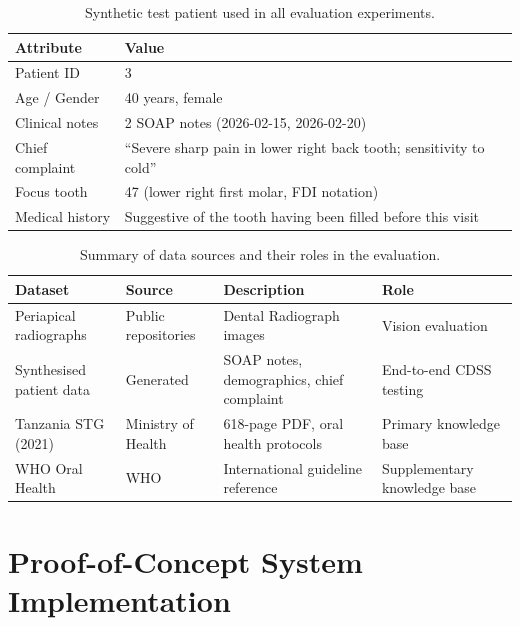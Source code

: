\documentclass[12pt,a4paper]{report}
\begin{document}
	\begin{table}[H]
		\centering
		\caption{Synthetic test patient used in all evaluation experiments.}
		\label{tab:patient}
		\small
		\begin{tabular}{@{}ll@{}}
			\toprule
			\textbf{Attribute} & \textbf{Value} \\
			\midrule
			Patient ID          & 3 \\
			Age / Gender        & 40 years, female \\
			Clinical notes      & 2 SOAP notes (2026-02-15, 2026-02-20) \\
			Chief complaint     & ``Severe sharp pain in lower right back tooth; sensitivity to cold'' \\
			Focus tooth         & 47 (lower right first molar, FDI notation) \\
			Medical history     & Suggestive of the tooth having been filled before this visit \\
			\bottomrule
		\end{tabular}
	\end{table}
	
	\begin{table}[H]
		\centering
		\caption{Summary of data sources and their roles in the evaluation.}
		\label{tab:datasources}
		\small
		\renewcommand{\arraystretch}{1.2}
		\begin{tabularx}{\textwidth}{@{}l l X l@{}}
			\toprule
			\textbf{Dataset} & \textbf{Source} & \textbf{Description} & \textbf{Role} \\
			\midrule
			Periapical radiographs  & Public repositories & Dental Radiograph images   & Vision evaluation \\
			Synthesised patient data & Generated          & SOAP notes, demographics, chief complaint     & End-to-end CDSS testing \\
			Tanzania STG (2021)     & Ministry of Health & 618-page PDF, oral health protocols & Primary knowledge base \\
			WHO Oral Health         & WHO & International guideline reference         & Supplementary knowledge base \\
			\bottomrule
		\end{tabularx}
	\end{table}
	
	\section{Proof-of-Concept System Implementation}
	\label{sec:implementation}
	
\end{document}
